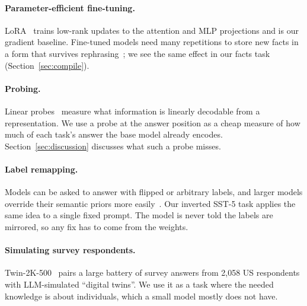 \paragraph{Parameter-efficient fine-tuning.} LoRA~\citep{hu2022lora} trains low-rank updates to the attention and MLP projections and is our gradient baseline. Fine-tuned models need many repetitions to store new facts in a form that survives rephrasing~\citep{allenzhu2023physics}; we see the same effect in our facts task (Section~\ref{sec:compile}).

\paragraph{Probing.} Linear probes~\citep{alain2016probes} measure what information is linearly decodable from a representation. We use a probe at the answer position as a cheap measure of how much of each task's answer the base model already encodes. Section~\ref{sec:discussion} discusses what such a probe misses.

\paragraph{Label remapping.} Models can be asked to answer with flipped or arbitrary labels, and larger models override their semantic priors more easily~\citep{wei2023larger}. Our inverted SST-5 task applies the same idea to a single fixed prompt. The model is never told the labels are mirrored, so any fix has to come from the weights.

\paragraph{Simulating survey respondents.} Twin-2K-500~\citep{toubia2025twin} pairs a large battery of survey answers from 2,058 US respondents with LLM-simulated ``digital twins''. We use it as a task where the needed knowledge is about individuals, which a small model mostly does not have.
